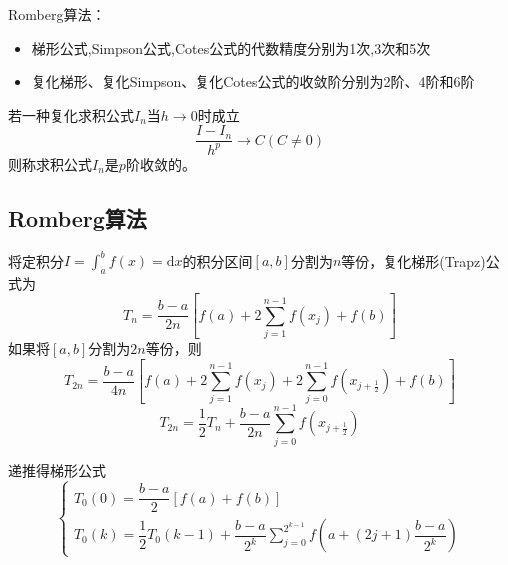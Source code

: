 \begin{note}
    Romberg算法：
    \begin{itemize}
        \item 梯形公式,Simpson公式,Cotes公式的代数精度分别为1次,3次和5次
        \item 复化梯形、复化Simpson、复化Cotes公式的收敛阶分别为2阶、4阶和6阶
    \end{itemize}
\end{note}
\begin{definition}[求积公式收敛阶]
    若一种复化求积公式$I_{n}$当$h\to 0$时成立
    \[
        \frac{I-I_{n}}{h^{p}}\to C(C\neq 0)  
    \]
    则称求积公式$I_{n}$是$p$阶收敛的。
\end{definition}
\subsection{Romberg算法}
将定积分$I=\int_{a}^{b}f(x)=\mathrm{d}x$的积分区间$[a,b]$分割为$n$等份，复化梯形(Trapz)公式为
\[
    T_n=\dfrac{b-a}{2n}[f(a)+2\sum_{j=1}^{n-1}f(x_j)+f(b)]
\]
如果将$[a,b]$分割为$2n$等份，则
\[
    T_{2n}=\dfrac{b-a}{4n}[f(a)+2\sum_{j=1}^{n-1}f(x_j)+2\sum_{j=0}^{n-1}f(x_{j+\frac{1}{2}})+f(b)]
\]
\[
    T_{2n}=\frac12T_n+\frac{b-a}{2n}\sum_{j=0}^{n-1}f(x_{j+\frac12})
\]
\begin{note}
    递推得梯形公式
    \[
        \left\{
            \begin{array}{l}
                T_{0}(0) = \dfrac{b-a}{2}\left[ f(a)+f(b) \right] \\
                T_{0}(k) = \dfrac{1}{2}T_{0}(k-1) + \dfrac{b-a}{2^k}\sum\limits_{j = 0}^{2^{k-1}}f\left( a+(2j+1)\dfrac{b-a}{2^k} \right)
            \end{array}
        \right.
    \]
\end{note}

